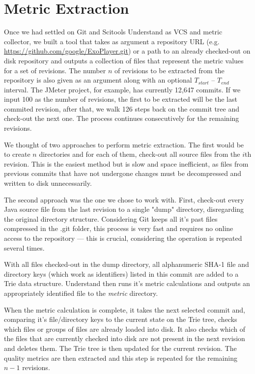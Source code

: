 \section{Metric Extraction} \label{sec:extraction}
Once we had settled on Git and Scitools Understand as VCS and metric collector, we built a tool that takes as argument a repository URL (e.g. \url{https://github.com/google/ExoPlayer.git}) or a path to an already checked-out on disk repository and outputs a collection of files that represent the metric values for a set of revisions. The number $n$ of revisions to be extracted from the repository is also given as an argument along with an optional $T_{start}$ -- $T_{end}$ interval. The JMeter project, for example, has currently 12,647 commits. If we input 100 as the number of revisions, the first to be extracted will be the last commited revision, after that, we walk 126 steps back on the commit tree and check-out the next one. The process continues consecutively for the remaining revisions.

We thought of two approaches to perform metric extraction. The first would be to create $n$ directories and for each of them, check-out all source files from the $i$th revision. This is the easiest method but is slow and space inefficient, as files from previous commits that have not undergone changes must be decompressed and written to disk unnecessarily.

The second approach was the one we chose to work with. First, check-out every Java source file from the last revision to a single "dump" directory, disregarding the original directory structure. Considering Git keeps all it's past files compressed in the .git folder, this process is very fast and requires no online access to the repository --- this is crucial, considering the operation is repeated several times.

With all files checked-out in the dump directory, all alphanumeric SHA-1 file and directory keys (which work as identifiers) listed in this commit are added to a Trie data structure. Understand then runs it's metric calculations and outputs an appropriately identified file to the \textit{metric} directory.

When the metric calculation is complete, it takes the next selected commit and, comparing it's file/directory keys to the current state on the Trie tree, checks which files or groups of files are already loaded into disk. It also checks which of the files that are currently checked into disk are not present in the next revision and deletes them. The Trie tree is then updated for the current revision. The quality metrics are then extracted and this step is repeated for the remaining $n-1$ revisions.

